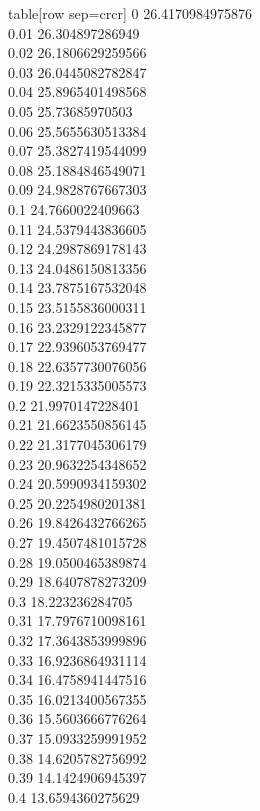   table[row sep=crcr]{%
0	26.4170984975876\\
0.01	26.304897286949\\
0.02	26.1806629259566\\
0.03	26.0445082782847\\
0.04	25.8965401498568\\
0.05	25.73685970503\\
0.06	25.5655630513384\\
0.07	25.3827419544099\\
0.08	25.1884846549071\\
0.09	24.9828767667303\\
0.1	24.7660022409663\\
0.11	24.5379443836605\\
0.12	24.2987869178143\\
0.13	24.0486150813356\\
0.14	23.7875167532048\\
0.15	23.5155836000311\\
0.16	23.2329122345877\\
0.17	22.9396053769477\\
0.18	22.6357730076056\\
0.19	22.3215335005573\\
0.2	21.9970147228401\\
0.21	21.6623550856145\\
0.22	21.3177045306179\\
0.23	20.9632254348652\\
0.24	20.5990934159302\\
0.25	20.2254980201381\\
0.26	19.8426432766265\\
0.27	19.4507481015728\\
0.28	19.0500465389874\\
0.29	18.6407878273209\\
0.3	18.223236284705\\
0.31	17.7976710098161\\
0.32	17.3643853999896\\
0.33	16.9236864931114\\
0.34	16.4758941447516\\
0.35	16.0213400567355\\
0.36	15.5603666776264\\
0.37	15.0933259991952\\
0.38	14.6205782756992\\
0.39	14.1424906945397\\
0.4	13.6594360275629\\
}
